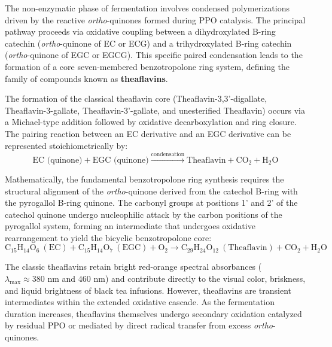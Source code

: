\documentclass{article}
\begin{document}
The non-enzymatic phase of fermentation involves condensed polymerizations driven by the reactive \textit{ortho}-quinones formed during PPO catalysis. The principal pathway proceeds via oxidative coupling between a dihydroxylated B-ring catechin (\textit{ortho}-quinone of EC or ECG) and a trihydroxylated B-ring catechin (\textit{ortho}-quinone of EGC or EGCG). This specific paired condensation leads to the formation of a core seven-membered benzotropolone ring system, defining the family of compounds known as \textbf{theaflavins}.

The formation of the classical theaflavin core (Theaflavin-3,3'-digallate, Theaflavin-3-gallate, Theaflavin-3'-gallate, and unesterified Theaflavin) occurs via a Michael-type addition followed by oxidative decarboxylation and ring closure. The pairing reaction between an EC derivative and an EGC derivative can be represented stoichiometrically by:
\begin{equation}
\text{EC (quinone)} + \text{EGC (quinone)} \xrightarrow{\text{condensation}} \text{Theaflavin} + \text{CO}_2 + \text{H}_2\text{O}
\end{equation}

Mathematically, the fundamental benzotropolone ring synthesis requires the structural alignment of the \textit{ortho}-quinone derived from the catechol B-ring with the pyrogallol B-ring quinone. The carbonyl groups at positions 1' and 2' of the catechol quinone undergo nucleophilic attack by the carbon positions of the pyrogallol system, forming an intermediate that undergoes oxidative rearrangement to yield the bicyclic benzotropolone core:
\begin{equation}
\text{C}_{15}\text{H}_{14}\text{O}_6 \ (\text{EC}) + \text{C}_{15}\text{H}_{14}\text{O}_7 \ (\text{EGC}) + \text{O}_2 \longrightarrow \text{C}_{29}\text{H}_{24}\text{O}_{12} \ (\text{Theaflavin}) + \text{CO}_2 + \text{H}_2\text{O}
\end{equation}

The classic theaflavins retain bright red-orange spectral absorbances ($\lambda_{\max} \approx 380\text{ nm}$ and $460\text{ nm}$) and contribute directly to the visual color, briskness, and liquid brightness of black tea infusions. However, theaflavins are transient intermediates within the extended oxidative cascade. As the fermentation duration increases, theaflavins themselves undergo secondary oxidation catalyzed by residual PPO or mediated by direct radical transfer from excess \textit{ortho}-quinones.
\end{document}
